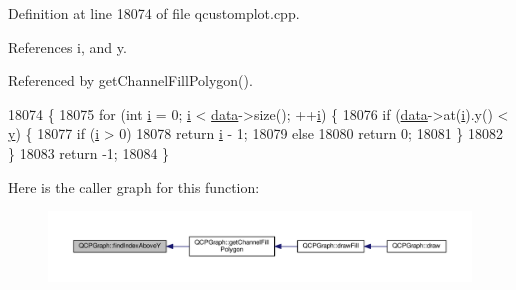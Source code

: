 Definition at line 18074 of file qcustomplot.\+cpp.



References i, and y.



Referenced by get\+Channel\+Fill\+Polygon().


\begin{DoxyCode}
18074                                                                           \{
18075   \textcolor{keywordflow}{for} (\textcolor{keywordtype}{int} \hyperlink{_comparision_pictures_2_createtest_image_8m_a6f6ccfcf58b31cb6412107d9d5281426}{i} = 0; \hyperlink{_comparision_pictures_2_createtest_image_8m_a6f6ccfcf58b31cb6412107d9d5281426}{i} < \hyperlink{class_q_c_p_graph_a2f58436df4f86a2792b776a21642b3d9}{data}->size(); ++\hyperlink{_comparision_pictures_2_createtest_image_8m_a6f6ccfcf58b31cb6412107d9d5281426}{i}) \{
18076     \textcolor{keywordflow}{if} (\hyperlink{class_q_c_p_graph_a2f58436df4f86a2792b776a21642b3d9}{data}->at(\hyperlink{_comparision_pictures_2_createtest_image_8m_a6f6ccfcf58b31cb6412107d9d5281426}{i}).y() < \hyperlink{_comparision_pictures_2_createtest_image_8m_a2fb1c5cf58867b5bbc9a1b145a86f3a0}{y}) \{
18077       \textcolor{keywordflow}{if} (\hyperlink{_comparision_pictures_2_createtest_image_8m_a6f6ccfcf58b31cb6412107d9d5281426}{i} > 0)
18078         \textcolor{keywordflow}{return} \hyperlink{_comparision_pictures_2_createtest_image_8m_a6f6ccfcf58b31cb6412107d9d5281426}{i} - 1;
18079       \textcolor{keywordflow}{else}
18080         \textcolor{keywordflow}{return} 0;
18081     \}
18082   \}
18083   \textcolor{keywordflow}{return} -1;
18084 \}
\end{DoxyCode}


Here is the caller graph for this function\+:\nopagebreak
\begin{figure}[H]
\begin{center}
\leavevmode
\includegraphics[width=350pt]{class_q_c_p_graph_adf50243f1df203883a2187089734bfcb_icgraph}
\end{center}
\end{figure}


\hypertarget{class_q_c_p_graph_a6f4e9461d5925be9228fc4760249a04f}{}
